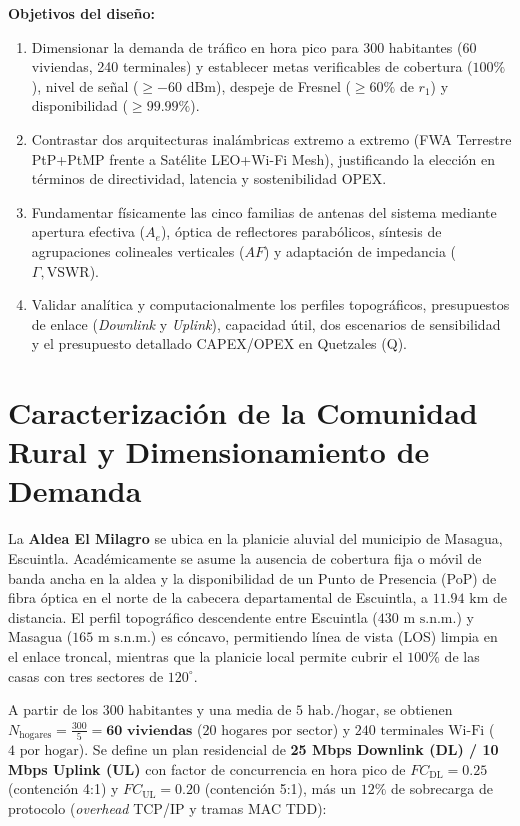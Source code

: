 \documentclass[10pt,letterpaper]{article}
\begin{document}
\textbf{Objetivos del diseño:}
\begin{enumerate}
    \item Dimensionar la demanda de tráfico en hora pico para 300 habitantes (60 viviendas, 240 terminales) y establecer metas verificables de cobertura ($100\%$), nivel de señal ($\ge -60\text{ dBm}$), despeje de Fresnel ($\ge 60\%$ de $r_1$) y disponibilidad ($\ge 99.99\%$).
    \item Contrastar dos arquitecturas inalámbricas extremo a extremo (FWA Terrestre PtP+PtMP frente a Satélite LEO+Wi-Fi Mesh), justificando la elección en términos de directividad, latencia y sostenibilidad OPEX.
    \item Fundamentar físicamente las cinco familias de antenas del sistema mediante apertura efectiva ($A_e$), óptica de reflectores parabólicos, síntesis de agrupaciones colineales verticales ($AF$) y adaptación de impedancia ($\Gamma, \text{VSWR}$).
    \item Validar analítica y computacionalmente los perfiles topográficos, presupuestos de enlace (\textit{Downlink} y \textit{Uplink}), capacidad útil, dos escenarios de sensibilidad y el presupuesto detallado CAPEX/OPEX en Quetzales (Q).
\end{enumerate}


\newpage
\section{Caracterización de la Comunidad Rural y Dimensionamiento de Demanda}

La \textbf{Aldea El Milagro} se ubica en la planicie aluvial del municipio de Masagua, Escuintla. Académicamente se asume la ausencia de cobertura fija o móvil de banda ancha en la aldea y la disponibilidad de un Punto de Presencia (PoP) de fibra óptica en el norte de la cabecera departamental de Escuintla, a $11.94\text{ km}$ de distancia. El perfil topográfico descendente entre Escuintla ($430\text{ m s.n.m.}$) y Masagua ($165\text{ m s.n.m.}$) es cóncavo, permitiendo línea de vista (LOS) limpia en el enlace troncal, mientras que la planicie local permite cubrir el $100\%$ de las casas con tres sectores de $120^\circ$.

A partir de los $300\text{ habitantes}$ y una media de $5\text{ hab./hogar}$, se obtienen $N_{\text{hogares}} = \frac{300}{5} = \mathbf{60\text{ viviendas}}$ ($20\text{ hogares por sector}$) y $240\text{ terminales Wi-Fi}$ ($4\text{ por hogar}$). Se define un plan residencial de \textbf{25 Mbps Downlink (DL) / 10 Mbps Uplink (UL)} con factor de concurrencia en hora pico de $FC_{\text{DL}} = 0.25$ (contención 4:1) y $FC_{\text{UL}} = 0.20$ (contención 5:1), más un $12\%$ de sobrecarga de protocolo (\textit{overhead} TCP/IP y tramas MAC TDD):
\end{document}
